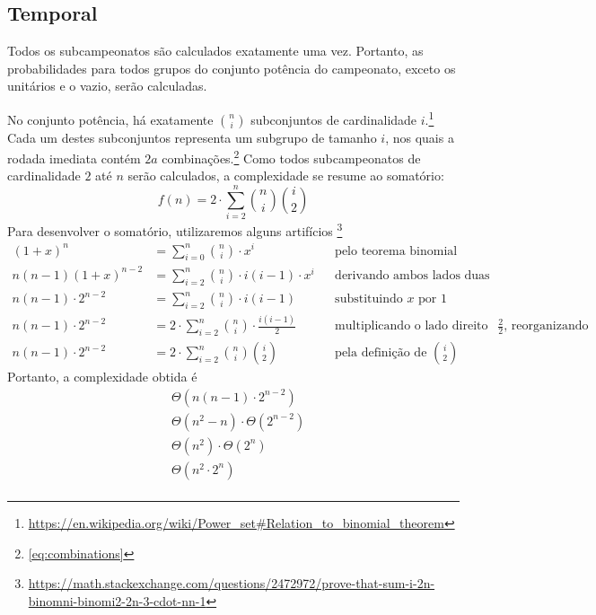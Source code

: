 \documentclass{article}
\begin{document}
\subsection{Temporal}
\noindent Todos os subcampeonatos são calculados exatamente uma vez. Portanto, as probabilidades para todos grupos do conjunto potência do campeonato, exceto os unitários e o vazio, serão calculadas.

\noindent No conjunto potência, há exatamente $\binom{n}{i}$ subconjuntos de cardinalidade $i$.\footnote{\label{link1}\url{https://en.wikipedia.org/wiki/Power_set\#Relation_to_binomial_theorem}} Cada um destes subconjuntos representa um subgrupo de tamanho $i$, nos quais a rodada imediata contém $2a$ combinações.\footnote{\label{link2}\autoref{eq:combinations}} Como todos subcampeonatos de cardinalidade $2$ até $n$ serão calculados, a complexidade se resume ao somatório:
\[ f(n) = 2 \cdot \sum_{i=2}^n \binom{n}{i} \binom{i}{2} \]
Para desenvolver o somatório, utilizaremos alguns artifícios \footnote{\label{link3}\url{https://math.stackexchange.com/questions/2472972/prove-that-sum-i-2n-binomni-binomi2-2n-3-cdot-nn-1}}
\begin{align*}
  {(1 + x)}^n &= \sum_{i=0}^n \binom{n}{i} \cdot x^i && \text{pelo teorema binomial} \\
  n(n - 1){(1 + x)}^{n - 2} &= \sum_{i = 2}^n \binom{n}{i} \cdot i(i - 1) \cdot x^i && \text{derivando ambos lados duas vezes} \\
  n(n - 1) \cdot 2^{n - 2} &= \sum_{i = 2}^n \binom{n}{i} \cdot i(i - 1) && \text{substituindo $x$ por $1$} \\
  n(n - 1) \cdot 2^{n - 2} &= 2 \cdot \sum_{i = 2}^n \binom{n}{i} \cdot \frac{i(i - 1)}{2} && \text{multiplicando o lado direito por $\frac{2}{2}$, reorganizando} \\
  n(n - 1) \cdot 2^{n - 2} &= 2 \cdot \sum_{i = 2}^n \binom{n}{i} \binom{i}{2} && \text{pela definição de $\binom{i}{2}$}
\end{align*}
Portanto, a complexidade obtida é
\begin{align*}
  & \Theta \left( n(n - 1) \cdot 2^{n - 2} \right) \\
  & \Theta \left( n^2 - n \right) \cdot \Theta \left( 2^{n - 2} \right) \\
  & \Theta \left( n^2 \right) \cdot \Theta \left( 2^n \right) \\
  & \Theta \left( n^2 \cdot 2^n \right) \\
\end{align*}
\end{document}
